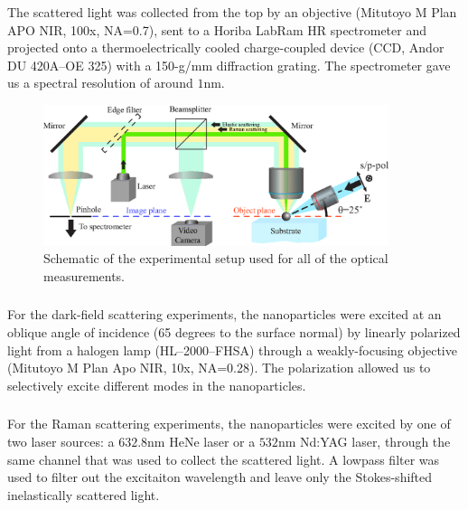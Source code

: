             The scattered light was collected from the top by an objective (Mitutoyo M Plan APO NIR, 100x, NA=0.7),
            sent to a Horiba LabRam HR spectrometer and projected onto a thermoelectrically cooled charge-coupled device
            (CCD, Andor DU 420A--OE 325) with a 150-g/mm diffraction grating. The spectrometer gave us a spectral resolution
            of around $1$nm.

            \begin{figure}[h!]
                    \begin{center}
                        \includegraphics[width=0.9\textwidth]{figs/methods/expSetup2.eps}
                    \end{center}
                    \label{fig:expSetup}
                    \caption{Schematic of the experimental setup used for all of the optical measurements.}
            \end{figure}


        \subsubsection{}
            \label{sec:Darkfield}
                For the dark-field scattering experiments, the nanoparticles were excited at an oblique angle of incidence
            (65 degrees to the surface normal) by linearly polarized light from a halogen lamp (HL--2000--FHSA)
            through a weakly-focusing objective (Mitutoyo M Plan Apo NIR, 10x, NA=0.28). The polarization allowed us to
            selectively excite different modes in the nanoparticles\cite{permyakov2015probing}.

        \subsubsection{}
        \label{sec:Raman}
                For the Raman scattering experiments, the nanoparticles were excited by one of two laser sources: a $632.8$nm HeNe laser
            or a $532$nm Nd:YAG laser, through the same channel that was used to collect the scattered light. A lowpass filter was used
            to filter out the excitaiton wavelength and leave only the Stokes-shifted inelastically scattered light.

